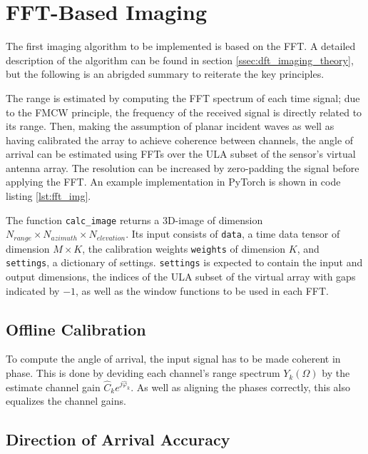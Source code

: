 \section{FFT-Based Imaging}

The first imaging algorithm to be implemented is based on the FFT.
A detailed description of the algorithm can be found in section \ref{ssec:dft_imaging_theory},
but the following is an abrigded summary to reiterate the key principles.

The range is estimated by computing the FFT spectrum of each time signal;
due to the FMCW principle, the frequency of the received signal is directly related to its range.
Then, making the assumption of planar incident waves
as well as having calibrated the array to achieve coherence between channels,
the angle of arrival can be estimated using FFTs over the ULA subset of the sensor's virtual antenna array.
The resolution can be increased by zero-padding the signal before applying the FFT.
An example implementation in PyTorch is shown in code listing \ref{lst:fft_img}.



The function \verb|calc_image| returns a 3D-image of dimension $N_{range} \times N_{azimuth} \times N_{elevation}$.
Its input consists of \verb|data|, a time data tensor of dimension $M \times K$,
the calibration weights \verb|weights| of dimension $K$, and \verb|settings|, a dictionary of settings.
\verb|settings| is expected to contain the input and output dimensions,
the indices of the ULA subset of the virtual array with gaps indicated by $-1$,
as well as the window functions to be used in each FFT.

\subsection{Offline Calibration}
To compute the angle of arrival, the input signal has to be made coherent in phase.
This is done by deviding each channel's range spectrum $Y_k(\Omega)$ by the estimate channel gain $\hat C_k e^{j\hat \varphi_k}$.
As well as aligning the phases correctly, this also equalizes the channel gains. \\

\subsection{Direction of Arrival Accuracy}

